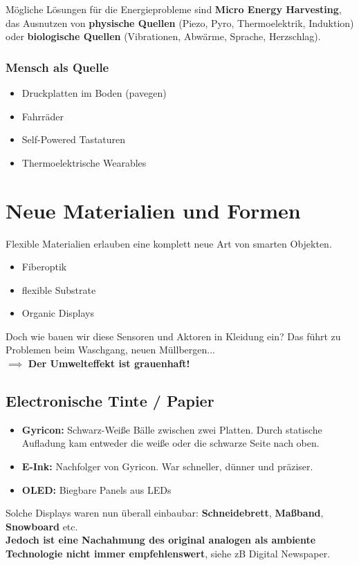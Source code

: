 \documentclass[a4paper]{article}
\begin{document}
Mögliche Lösungen für die Energieprobleme sind \textbf{Micro Energy Harvesting}, das Ausnutzen von \textbf{physische Quellen} (Piezo, Pyro, Thermoelektrik, Induktion) oder \textbf{biologische Quellen} (Vibrationen, Abwärme, Sprache, Herzschlag).
\subsubsection{Mensch als Quelle}
\begin{itemize}
	\item Druckplatten im Boden (pavegen)
	\item Fahrräder
	\item Self-Powered Tastaturen
	\item Thermoelektrische Wearables
\end{itemize}

\newpage
\section{Neue Materialien und Formen}
Flexible Materialien erlauben eine komplett neue Art von smarten Objekten.
\begin{itemize}
	\item Fiberoptik
	\item flexible Substrate
	\item Organic Displays
\end{itemize}
Doch wie bauen wir diese Sensoren und Aktoren in Kleidung ein? Das führt zu Problemen beim Waschgang, neuen Müllbergen... \\
$\implies$ \textbf{Der Umwelteffekt ist grauenhaft!}
\subsection{Electronische Tinte / Papier}
\begin{itemize}
	\item \textbf{Gyricon:} Schwarz-Weiße Bälle zwischen zwei Platten. Durch statische Aufladung kam entweder die weiße oder die schwarze Seite nach oben.
	\item \textbf{E-Ink:} Nachfolger von Gyricon. War schneller, dünner und präziser.
	\item \textbf{OLED:} Biegbare Panels aus LEDs
\end{itemize}
Solche Displays waren nun überall einbaubar: \textbf{Schneidebrett}, \textbf{Maßband}, \textbf{Snowboard} etc.\\
\textbf{ Jedoch ist eine Nachahmung des original analogen als ambiente Technologie nicht immer empfehlenswert}, siehe zB Digital Newspaper.
\end{document}
